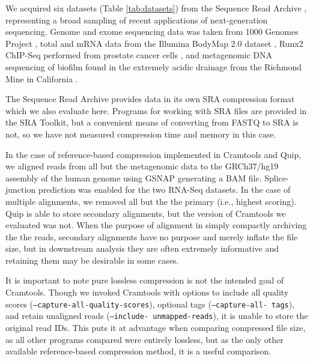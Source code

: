 \documentclass[a4,center,fleqn]{NAR}
\begin{document}
We acquired six datasets (Table \ref{tab:datasets}) from the Sequence Read
Archive \citep{Leinonen2011}, representing a broad sampling of recent
applications of next-generation sequencing. Genome and exome sequencing data was
taken from 1000 Genomes Project
\citep{The1000GenomesConsortium2010},
total and mRNA data from the Illumina BodyMap
2.0 dataset \citep{Asmann2012},
Runx2 ChIP-Seq performed from prostate cancer cells
\citep{Little2011}, and metagenomic DNA sequencing of biofilm found in the extremely acidic
drainage from the Richmond Mine in California
\citep{Denef2010}.

The Sequence Read Archive provides data in its own SRA compression format
which we also evaluate here. Programs for working with SRA files are provided
in the SRA Toolkit, but a convenient means of converting from FASTQ to SRA is
not, so we have not measured compression time and memory in this case.


In the case of reference-based compression implemented in Cramtools and Quip, we
aligned reads from all but the metagenomic data to the GRCh37/hg19 assembly of
the human genome using GSNAP \citep{Wu2010} generating a BAM file. Splice-
junction prediction was enabled for the two RNA-Seq datasets. In the case of
multiple alignments, we removed all but the the primary (i.e., highest
scoring). Quip is able to store secondary alignments, but the version of
Cramtools we evaluated was not. When the purpose of alignment in simply
compactly archiving the the reads, secondary alignments have no purpose and
merely inflate the file size, but in downstream analysis they are often
extremely informative and retaining them may be desirable in some cases.


It is important to note pure lossless compression is not the intended goal of
Cramtools. Though we invoked Cramtools with options to include all quality
scores (\texttt{--capture-all-quality-scores}), optional tags (\texttt
{--capture-all- tags}), and retain unaligned reads (\texttt{--include-
unmapped-reads}), it is unable to store the original read IDs. This puts it at
advantage when comparing compressed file size, as all other programs compared
were entirely lossless, but as the only other available reference-based
compression method, it is a useful comparison.

\end{document}
